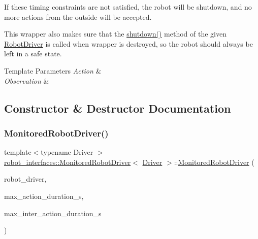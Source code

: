 If these timing constraints are not satisfied, the robot will be shutdown, and no more actions from the outside will be accepted.

This wrapper also makes sure that the {\ttfamily \hyperlink{classrobot__interfaces_1_1MonitoredRobotDriver_a95714a60e69a3ac06461382a7b391289}{shutdown()}} method of the given \hyperlink{classrobot__interfaces_1_1RobotDriver}{Robot\+Driver} is called when wrapper is destroyed, so the robot should always be left in a safe state.


\begin{DoxyTemplParams}{Template Parameters}
{\em Action} & \\
\hline
{\em Observation} & \\
\hline
\end{DoxyTemplParams}


\subsection{Constructor \& Destructor Documentation}
\mbox{\label{classrobot__interfaces_1_1MonitoredRobotDriver_a2ea1456e85ad7596295cb047e552dc06}} 
\subsubsection{\texorpdfstring{Monitored\+Robot\+Driver()}{MonitoredRobotDriver()}}
{\footnotesize\ttfamily template$<$typename Driver $>$ \\
\hyperlink{classrobot__interfaces_1_1MonitoredRobotDriver}{robot\+\_\+interfaces\+::\+Monitored\+Robot\+Driver}$<$ \hyperlink{classDriver}{Driver} $>$\+::\hyperlink{classrobot__interfaces_1_1MonitoredRobotDriver}{Monitored\+Robot\+Driver} (\begin{DoxyParamCaption}\item[{Robot\+Driver\+Ptr}]{robot\+\_\+driver,  }\item[{const double}]{max\+\_\+action\+\_\+duration\+\_\+s,  }\item[{const double}]{max\+\_\+inter\+\_\+action\+\_\+duration\+\_\+s }\end{DoxyParamCaption})\hspace{0.3cm}{\ttfamily [inline]}}




